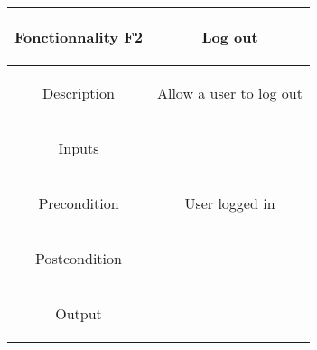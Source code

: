 \documentclass{report}
\begin{document}
\begin{center}
	\begin{tabular}{|c|c|}
	\hline
	\begin{bf}Fonctionnality F2\end{bf} & \begin{bf}Log out\end{bf} \\
	\hline
	\begin{bf}Description\end{bf} & \begin{bf}Allow a user to log out\end{bf}  \\
	\hline
	\begin{bf}Inputs\end{bf} & \begin{bf}\end{bf} \\
	\hline
	\begin{bf}Precondition\end{bf} & \begin{bf}User logged in\end{bf}  \\
	\hline
	\begin{bf}Postcondition\end{bf} & \begin{bf}\end{bf} \\
	\hline
	\begin{bf}Output\end{bf} & \begin{bf}\end{bf} \\
	\hline
	\end{tabular}
\end{center}
\end{document}
